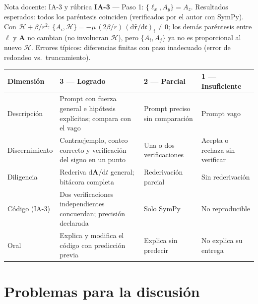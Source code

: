 \documentclass[aspectratio=169]{beamer}
\newcommand{\dd}{\mathrm{d}}
\newcommand{\vA}{\mathbf A}
\newcommand{\vl}{\boldsymbol\ell}
\newcommand{\rh}{\hat{\mathbf r}}
\newcommand{\PB}[2]{\{#1,#2\}}
\newcommand{\Hc}{\mathcal H}
\begin{document}
\begin{frame}{Nota docente: IA-3 y rúbrica}
\scriptsize
\textbf{IA-3} — Paso 1: $\PB{\ell_x}{A_y}=A_z$. Resultados esperados: todos los paréntesis coinciden
(verificados por el autor con SymPy). Con $\Hc+\beta/r^{2}$:
$\PB{A_i}{\Hc}=-\mu\,(2\beta/r)\,(\dd\rh/\dd t)_i\neq0$; los demás paréntesis entre $\vl$ y $\vA$ no
cambian (no involucran $\Hc$), pero $\PB{A_i}{A_j}$ ya no es proporcional al nuevo $\Hc$.
Errores típicos: diferencias finitas con paso inadecuado (error de redondeo vs.\ truncamiento).

\medskip
\begin{tabular}{p{2.0cm}p{3.9cm}p{3.9cm}p{3.9cm}}
\toprule
Dimensión & 3 --- Logrado & 2 --- Parcial & 1 --- Insuficiente\\
\midrule
Descripción & Prompt con fuerza general e hipótesis explícitas; compara con el vago & Prompt preciso sin comparación & Prompt vago\\
Discernimiento & Contraejemplo, conteo correcto y verificación del signo en un punto & Una o dos verificaciones & Acepta o rechaza sin verificar\\
Diligencia & Rederiva $\dd\vA/\dd t$ general; bitácora completa & Rederivación parcial & Sin rederivación\\
Código (IA-3) & Dos verificaciones independientes concuerdan; precisión declarada & Solo SymPy & No reproducible\\
Oral & Explica y modifica el código con predicción previa & Explica sin predecir & No explica su entrega\\
\bottomrule
\end{tabular}
\end{frame}
\fi

\section[Problemas]{Problemas para la discusión}
\end{document}
